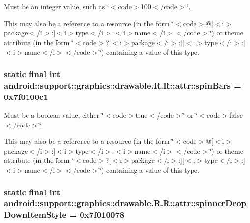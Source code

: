 Must be an \hyperlink{classandroid_1_1support_1_1graphics_1_1drawable_1_1_r_1_1integer}{integer} value, such as \char`\"{}$<$code$>$100$<$/code$>$\char`\"{}. 

This may also be a reference to a resource (in the form \char`\"{}$<$code$>$@\mbox{[}$<$i$>$package$<$/i$>$:\mbox{]}$<$i$>$type$<$/i$>$:$<$i$>$name$<$/i$>$$<$/code$>$\char`\"{}) or theme attribute (in the form \char`\"{}$<$code$>$?\mbox{[}$<$i$>$package$<$/i$>$:\mbox{]}\mbox{[}$<$i$>$type$<$/i$>$:\mbox{]}$<$i$>$name$<$/i$>$$<$/code$>$\char`\"{}) containing a value of this type. \hypertarget{classandroid_1_1support_1_1graphics_1_1drawable_1_1_r_1_1attr_1ea4154167f0239cb7ca6e7f27612827}{
\subsubsection[{spinBars}]{\setlength{\rightskip}{0pt plus 5cm}static final int android::support::graphics::drawable.R.R::attr::spinBars = 0x7f0100c1}}
\label{classandroid_1_1support_1_1graphics_1_1drawable_1_1_r_1_1attr_1ea4154167f0239cb7ca6e7f27612827}


Must be a boolean value, either \char`\"{}$<$code$>$true$<$/code$>$\char`\"{} or \char`\"{}$<$code$>$false$<$/code$>$\char`\"{}. 

This may also be a reference to a resource (in the form \char`\"{}$<$code$>$@\mbox{[}$<$i$>$package$<$/i$>$:\mbox{]}$<$i$>$type$<$/i$>$:$<$i$>$name$<$/i$>$$<$/code$>$\char`\"{}) or theme attribute (in the form \char`\"{}$<$code$>$?\mbox{[}$<$i$>$package$<$/i$>$:\mbox{]}\mbox{[}$<$i$>$type$<$/i$>$:\mbox{]}$<$i$>$name$<$/i$>$$<$/code$>$\char`\"{}) containing a value of this type. \hypertarget{classandroid_1_1support_1_1graphics_1_1drawable_1_1_r_1_1attr_22f36d555e77115c843d98a3f3f3bd5b}{
\subsubsection[{spinnerDropDownItemStyle}]{\setlength{\rightskip}{0pt plus 5cm}static final int android::support::graphics::drawable.R.R::attr::spinnerDropDownItemStyle = 0x7f010078}}
\label{classandroid_1_1support_1_1graphics_1_1drawable_1_1_r_1_1attr_22f36d555e77115c843d98a3f3f3bd5b}


